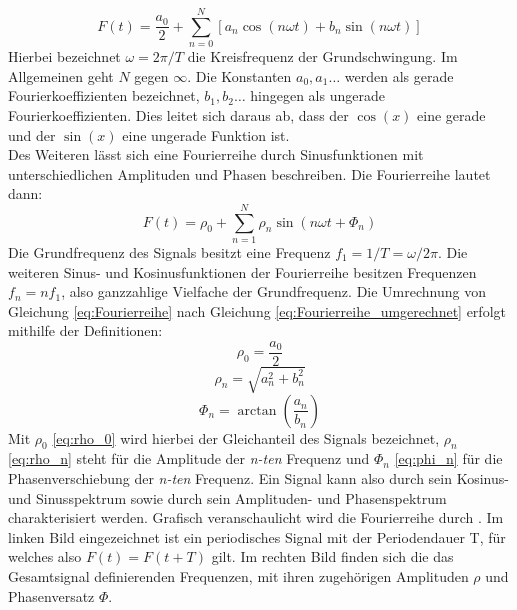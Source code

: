 \begin{equation}
	\label{eq:Fourierreihe}
	F(t) = \dfrac{a_0}{2} + \sum_{n=0}^N[a_n \cos(n \omega t) + b_n \sin(n \omega t)]
\end{equation}
Hierbei bezeichnet $\omega = 2 \pi / T$ die Kreisfrequenz der Grundschwingung. Im Allgemeinen geht $N$ gegen $\infty$. Die Konstanten $a_0,a_1 \dots $ werden als gerade Fourierkoeffizienten bezeichnet, $b_1, b_2 \dots $ hingegen als ungerade Fourierkoeffizienten. Dies leitet sich daraus ab, dass der $\cos(x)$ eine gerade und der $\sin(x)$ eine ungerade Funktion ist. \\
Des Weiteren lässt sich eine Fourierreihe durch Sinusfunktionen mit unterschiedlichen Amplituden und Phasen beschreiben. Die Fourierreihe lautet dann:
\begin{equation}
	\label{eq:Fourierreihe_umgerechnet}
	F(t) = \rho_0 + \sum_{n=1}^{N} \rho_n \sin(n \omega t + \Phi_n)
\end{equation}
Die Grundfrequenz des Signals besitzt eine Frequenz $f_1 = 1/ T = \omega / 2 \pi$. Die weiteren Sinus- und Kosinusfunktionen der Fourierreihe besitzen Frequenzen $f_n = nf_1$, also ganzzahlige Vielfache der Grundfrequenz. Die Umrechnung von Gleichung \ref{eq:Fourierreihe} nach Gleichung \ref{eq:Fourierreihe_umgerechnet} erfolgt mithilfe der Definitionen:
\begin{equation}
	\label{eq:rho_0}
	\rho_0 = \frac{a_0}{2}
\end{equation}
\begin{equation}
	\label{eq:rho_n}
	\rho_n = \sqrt{a_n^2 + b_n^2}
\end{equation}
\begin{equation}
	\label{eq:phi_n}
	\Phi_n = \arctan(\frac{a_n}{b_n})
\end{equation}
Mit $\rho_0$ \ref{eq:rho_0} wird hierbei der Gleichanteil des Signals bezeichnet, $\rho_n$ \ref{eq:rho_n} steht für die Amplitude der \textit{n-ten} Frequenz und $\Phi_n$ \ref{eq:phi_n} für die Phasenverschiebung der \textit{n-ten} Frequenz. Ein Signal kann also durch sein Kosinus- und Sinusspektrum sowie durch sein Amplituden- und Phasenspektrum charakterisiert werden. 
Grafisch veranschaulicht wird die Fourierreihe durch . Im linken Bild eingezeichnet ist ein periodisches Signal mit der Periodendauer T, für welches also $F(t) = F(t+T)$ gilt. Im rechten Bild finden sich die das Gesamtsignal definierenden Frequenzen, mit ihren zugehörigen Amplituden $\rho$ und Phasenversatz $\Phi$.

